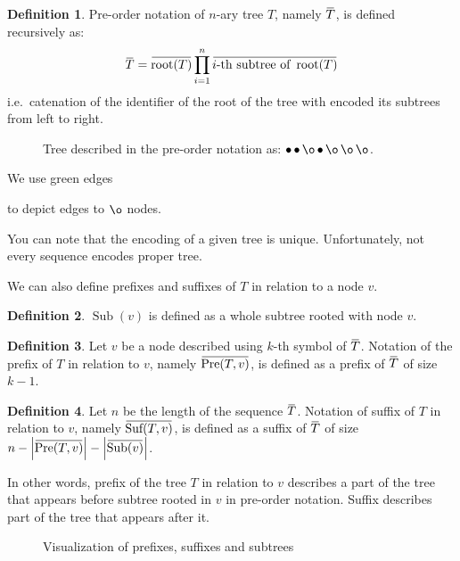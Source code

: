 \documentclass[final]{article}
\theoremstyle{definition}
\newtheorem{definition}{Definition}[subsection]
\theoremstyle{definition}
\theoremstyle{remark}
\newcommand{\ols}[1]{\mskip.5\thinmuskip\overline{\mskip-.5\thinmuskip {#1} \mskip-.5\thinmuskip}\mskip.5\thinmuskip} %
\newcommand{\enc}[1]{\ensuremath{\ols{#1}}}
\newcommand{\size}[1]{\ensuremath{\left|#1\right|}}
\DeclareMathOperator{\troot}{\text{root}}
\DeclareMathOperator{\tSub}{\text{Sub}}
\DeclareMathOperator{\tPre}{\text{Pre}}
\DeclareMathOperator{\tSuf}{\text{Suf}}
\DeclareMathOperator{\n}{\bullet}
\DeclareMathOperator{\no}{\o}
\begin{document}
\begin{definition}
    Pre-order notation of \(n\)-ary tree \(T\), namely \(\enc{T}\), is defined recursively as:
    \[\enc{T} = \enc{\troot(T)} \prod_{i=1}^{n} \enc{i\text{-th subtree of } \troot(T)}\]
    i.e.\ catenation of the identifier of the root of the tree with encoded its subtrees from left to right.
\end{definition}

\begin{figure}[H]
    \centering
    
    \caption{Tree described in the pre-order notation as: \(\n \n \no \n \no \no \no\).}
    \label{fig:oononnn}
\end{figure}

We use green edges 
\begin{minipage}{1.5em}

\end{minipage}
to depict edges to \(\no\) nodes.

You can note that the encoding of a given tree is unique. Unfortunately, not every sequence encodes proper tree.

We can also define prefixes and suffixes of \(T\) in relation to a node \(v\).

\begin{definition}
    \(\tSub(v)\) is defined as a whole subtree rooted with node \(v\).
\end{definition}

\begin{definition}
    Let \(v\) be a node described using \(k\)-th symbol of \(\enc{T}\). Notation of the prefix of \(T\) in relation to \(v\), namely \(\enc{\tPre(T, v)}\), is defined as a prefix of \enc{T} of size \(k - 1\).
\end{definition}

\begin{definition}
    Let \(n\) be the length of the sequence \(\enc{T}\). Notation of suffix of \(T\) in relation to \(v\), namely \(\enc{\tSuf(T, v)}\), is defined as a suffix of \enc{T} of size \(n - \size{\enc{\tPre(T, v)}} - \size{\enc{\tSub(v)}}\).
\end{definition}

In other words, prefix of the tree \(T\) in relation to \(v\) describes a part of the tree that appears before subtree rooted in \(v\) in pre-order notation. Suffix describes part of the tree that appears after it.

\begin{figure}[H]
    \centering
    
    \caption{Visualization of prefixes, suffixes and subtrees}
    \label{fig:presuf}
\end{figure}
\end{document}
